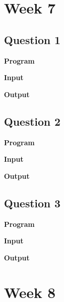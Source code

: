 \documentclass{article}
\begin{document}
% 

% 
% 
% 
\newpage
\section{Week 7}

\subsection{Question 1}

\newline 

\noindent \textbf{\large{Program}}

\newpage
\noindent \textbf{\large{Input}}

\noindent \textbf{\large{Output}}


\newpage
\subsection{Question 2}

\newline 

\noindent \textbf{\large{Program}}

\newpage
\noindent \textbf{\large{Input}}

\noindent \textbf{\large{Output}}


\newpage
\subsection{Question 3}

\newline 

\noindent \textbf{\large{Program}}

\newpage
\noindent \textbf{\large{Input}}

\noindent \textbf{\large{Output}}

\newpage
\section{Week 8}
\end{document}

